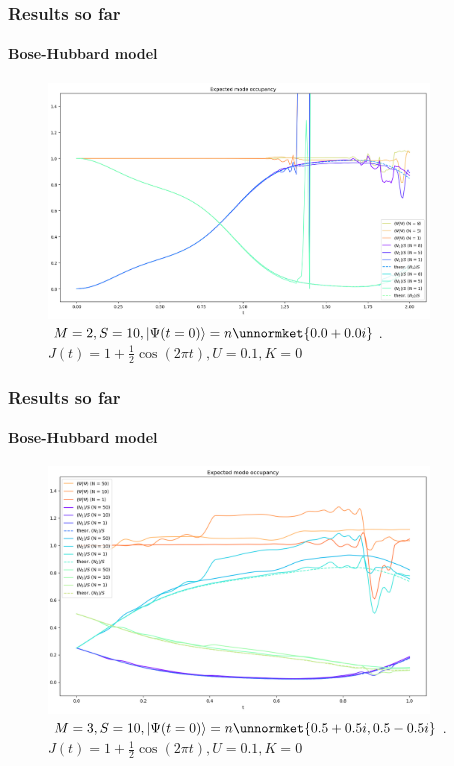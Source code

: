 \documentclass[english]{beamer}
\begin{document}
  \begin{frame}
  	\frametitle{Results so far}
  	\framesubtitle{Bose-Hubbard model}
  	\begin{figure}
	\centering
    		\includegraphics[width=0.9\textwidth]{images/BH_M=2}
    		\caption{$M=2, S=10, \ket{\Psi(t=0)}=n\unnormket{0.0+0.0i}$. $J(t)=1+\frac{1}{2}\cos(2\pi t), U=0.1, K=0$}
    		\label{fig:BH2}
	\end{figure}
  \end{frame}
  
  \begin{frame}
  	\frametitle{Results so far}
  	\framesubtitle{Bose-Hubbard model}
  	\begin{figure}
	\centering
    		\includegraphics[width=0.9\textwidth]{images/BH_M=3}
    		\caption{$M=3, S=10, \ket{\Psi(t=0)}=n\unnormket{0.5+0.5i,0.5-0.5i}$. $J(t)=1+\frac{1}{2}\cos(2\pi t), U=0.1, K=0$}
    		\label{fig:BH3}
	\end{figure}
  \end{frame}
  
\end{document}
